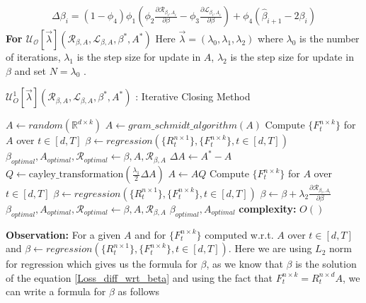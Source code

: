 \begin{equation}
\begin{aligned}
    \Delta \beta_{i} =  (1-\phi_4)\phi_1(\phi_2 \frac{\partial \mathcal{R}_{\beta_i, A_{i}}}{\partial \beta} - \phi_3 \frac{\partial \mathcal{L}_{\beta_i, A_{i}}}{\partial \beta} ) + \phi_4(\hat{\beta}_{i+1}-2\beta_{i})
\end{aligned}
\end{equation}
\hspace{2mm} \newline \textbf{For $\mathcal{U_{O}}[\vec{\lambda}](\mathcal{R}_{\beta, A},\mathcal{L}_{\beta, A},\beta^{*},A^{*})$}
\newline Here $\vec{\lambda} = (\lambda_0,\lambda_1,\lambda_2)$ where $\lambda_0$ is the number of iterations, $\lambda_1$ is the step size for update in $A$, $\lambda_2$ is the step size for update in $\beta$ and set $N = \lambda_0$ .
\begin{algorithm}[H]
\caption{$\mathcal{U}^{1}_{O}[\vec{\lambda}](\mathcal{R}_{\beta, A},\mathcal{L}_{\beta, A},\beta^{*},A^{*})$ : Iterative Closing Method}\label{lfm_baseline_method}
\begin{algorithmic}[1]
\State $A \gets random(\mathbb{R}^{d\times k})$
\State $A \gets gram\_schmidt\_algorithm(A)$
\State Compute $\{F^{n\times k}_{t}\}$ for $A$ over $t\in [d,T]$
\State $\beta \gets regression(\{R^{n\times 1}_{t}\},\{F^{n\times k}_{t}\}, t\in [d,T])$
\State $\beta_{optimal}, A_{optimal}, \mathcal{R}_{optimal} \gets \beta, A, \mathcal{R}_{\beta, A}$
    \State $\Delta A \gets A^{*} - A$
    \State $Q \gets \text{cayley\_transformation}(\frac{\lambda_1}{2} \Delta A)$ 
    \State $A \gets AQ$
    \State Compute $\{F^{n\times k}_{t}\}$ for $A$ over $t\in [d,T]$
    \State $\beta \gets regression(\{R^{n\times 1}_{t}\},\{F^{n\times k}_{t}\}, t\in [d,T])$
    \State $\beta \gets \beta + \lambda_2 \frac{\partial \mathcal{R}_{\beta_i, A_{i}}}{\partial \beta} $
      
        \State $\beta_{optimal}, A_{optimal}, \mathcal{R}_{optimal} \gets \beta, A, \mathcal{R}_{\beta, A} $
    \EndIf 
\EndFor
\State \Return  $\beta_{optimal}, A_{optimal}$
\State \textbf{complexity: } $O()$
\end{algorithmic}
\end{algorithm} \newline \textbf{Observation:} For a given $A$ and for $\{F^{n\times k}_{t}\}$ computed w.r.t. $A$ over $t\in [d,T]$ and $\beta \gets regression(\{R^{n\times 1}_{t}\},\{F^{n\times k}_{t}\}, t\in [d,T])$. Here we are using $L_2$ norm for regression which gives us the formula for $\beta$, as we know that $\beta$ is the solution of the equation \ref{Loss_diff_wrt_beta} and using the fact that $F^{n\times k}_{t} = R^{n\times d}_{t}A$, we can write a formula for $\beta$ as follows
